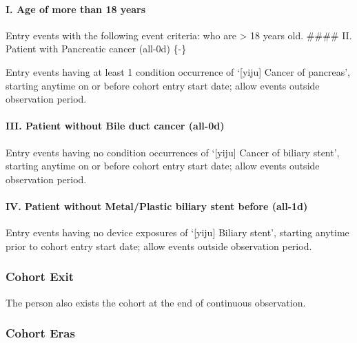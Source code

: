 \documentclass[
  12pt,
]{article}
\begin{document}
\paragraph*{I. Age of more than 18 years}\label{i.-age-of-more-than-18-years-1}

Entry events with the following event criteria: who are \textgreater{} 18 years old.
\#\#\#\# II. Patient with Pancreatic cancer (all-0d) \{-\}

Entry events having at least 1 condition occurrence of `{[}yiju{]} Cancer of pancreas', starting anytime on or before cohort entry start date; allow events outside observation period.

\paragraph*{III. Patient without Bile duct cancer (all-0d)}\label{iii.-patient-without-bile-duct-cancer-all-0d-1}

Entry events having no condition occurrences of `{[}yiju{]} Cancer of biliary stent', starting anytime on or before cohort entry start date; allow events outside observation period.

\paragraph*{IV. Patient without Metal/Plastic biliary stent before (all-1d)}\label{iv.-patient-without-metalplastic-biliary-stent-before-all-1d-1}

Entry events having no device exposures of `{[}yiju{]} Biliary stent', starting anytime prior to cohort entry start date; allow events outside observation period.

\subsubsection{Cohort Exit}\label{cohort-exit-1}

The person also exists the cohort at the end of continuous observation.

\subsubsection{Cohort Eras}\label{cohort-eras-1}
\end{document}
